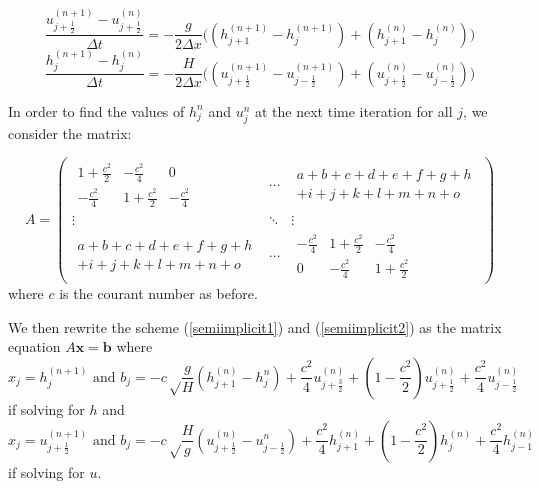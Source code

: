 \documentclass[a4paper,12pt, notitlepage]{report}
\begin{document}
\begin{equation}\label{semiimplicit1}
\frac{u_{j + \frac{1}{2}}^{(n + 1)} - u_{j + \frac{1}{2}}^{(n)}}{\Delta t} = -\frac{g}{2\Delta x} \bigg((h_{j + 1}^{(n+ 1)} - h_{j}^{(n+ 1)}) + (h_{j + 1}^{(n)} - h_{j}^{(n)})\bigg)
\end{equation}
\begin{equation}\label{semiimplicit2}
\frac{h_{j}^{(n + 1)} - h_{j}^{(n)}}{\Delta t} = -\frac{H}{2\Delta x} \bigg((u_{j + \frac{1}{2}}^{(n+ 1)} - u_{j - \frac{1}{2}}^{(n+ 1)}) + (u_{j + \frac{1}{2}}^{(n)} - u_{j - \frac{1}{2}}^{(n)})\bigg)
\end{equation}

In order to find the values of $h_{j}^{n}$ and $u_{j}^{n}$ at the next time iteration for all $j$, we consider the matrix:

\[
A = \left (
\begin{array}{ccc}
\begin{array}{ccc}
1 + \frac{c^{2}}{2} & -\frac{c^{2}}{4} & 0\\
-\frac{c^{2}}{4}& 1 + \frac{c^{2}}{2} & -\frac{c^{2}}{4} 
\end{array}
& \cdots & 
\begin{array}{l}
a+b+c+d+e+f+g+h\\
+i+j+k+l+m+n+o 
\end{array} \\
\vdots & \ddots & \vdots\\
\begin{array}{l}
a+b+c+d+e+f+g+h\\
+i+j+k+l+m+n+o 
\end{array} &
\cdots & 
\begin{array}{ccc}
-\frac{c^{2}}{4}& 1 + \frac{c^{2}}{2} & -\frac{c^{2}}{4} \\
0 & -\frac{c^{2}}{4} & 1 + \frac{c^{2}}{2}
\end{array}
\end{array}
\right )
\]
where $c$ is the courant number as before. 

We then rewrite the scheme (\ref{semiimplicit1}) and (\ref{semiimplicit2}) as the matrix equation $A \mathbf{x} = \mathbf{b}$ where 
\begin{equation}
x_{j} = h_{j}^{(n+1)} \text { and } b_{j} = -c\sqrt\frac{g}{H}(h_{j + 1}^{(n)} - h_{j}^{n}) + \frac{c^{2}}{4} u_{j + \frac{3}{2}}^{(n)} + (1 - \frac{c^{2}}{2})u_{j + \frac{1}{2}}^{(n)} + \frac{c^{2}}{4} u_{j - \frac{1}{2}}^{(n)}
\end{equation}
if solving for $h$ and
\begin{equation}
x_{j} = u_{j+ \frac{1}{2}}^{(n+1)} \text { and } b_{j} = -c\sqrt\frac{H}{g}(u_{j + \frac{1}{2}}^{(n)} - u_{j - \frac{1}{2}}^{n}) + \frac{c^{2}}{4} h_{j + 1}^{(n)} + (1 - \frac{c^{2}}{2})h_{j}^{(n)} + \frac{c^{2}}{4} h_{j - 1}^{(n)}
\end{equation}
if solving for $u$.
\end{document}
